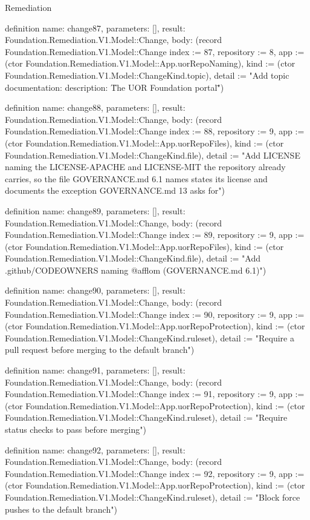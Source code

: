 \begin{lexlean}{Remediation}
\begin{semanticmodule}
definition{
  name: change87,
  parameters: [],
  result: Foundation.Remediation.V1.Model::Change,
  body: (record Foundation.Remediation.V1.Model::Change {index := 87, repository := 8, app := (ctor Foundation.Remediation.V1.Model::App.uorRepoNaming), kind := (ctor Foundation.Remediation.V1.Model::ChangeKind.topic), detail := "Add topic documentation: description: \"The UOR Foundation portal\""})
}

definition{
  name: change88,
  parameters: [],
  result: Foundation.Remediation.V1.Model::Change,
  body: (record Foundation.Remediation.V1.Model::Change {index := 88, repository := 9, app := (ctor Foundation.Remediation.V1.Model::App.uorRepoFiles), kind := (ctor Foundation.Remediation.V1.Model::ChangeKind.file), detail := "Add LICENSE naming the LICENSE-APACHE and LICENSE-MIT the repository already carries, so the file GOVERNANCE.md 6.1 names states its license and documents the exception GOVERNANCE.md 13 asks for"})
}

definition{
  name: change89,
  parameters: [],
  result: Foundation.Remediation.V1.Model::Change,
  body: (record Foundation.Remediation.V1.Model::Change {index := 89, repository := 9, app := (ctor Foundation.Remediation.V1.Model::App.uorRepoFiles), kind := (ctor Foundation.Remediation.V1.Model::ChangeKind.file), detail := "Add .github/CODEOWNERS naming @afflom (GOVERNANCE.md 6.1)"})
}

definition{
  name: change90,
  parameters: [],
  result: Foundation.Remediation.V1.Model::Change,
  body: (record Foundation.Remediation.V1.Model::Change {index := 90, repository := 9, app := (ctor Foundation.Remediation.V1.Model::App.uorRepoProtection), kind := (ctor Foundation.Remediation.V1.Model::ChangeKind.ruleset), detail := "Require a pull request before merging to the default branch"})
}

definition{
  name: change91,
  parameters: [],
  result: Foundation.Remediation.V1.Model::Change,
  body: (record Foundation.Remediation.V1.Model::Change {index := 91, repository := 9, app := (ctor Foundation.Remediation.V1.Model::App.uorRepoProtection), kind := (ctor Foundation.Remediation.V1.Model::ChangeKind.ruleset), detail := "Require status checks to pass before merging"})
}

definition{
  name: change92,
  parameters: [],
  result: Foundation.Remediation.V1.Model::Change,
  body: (record Foundation.Remediation.V1.Model::Change {index := 92, repository := 9, app := (ctor Foundation.Remediation.V1.Model::App.uorRepoProtection), kind := (ctor Foundation.Remediation.V1.Model::ChangeKind.ruleset), detail := "Block force pushes to the default branch"})
}


\end{semanticmodule}
\end{lexlean}
